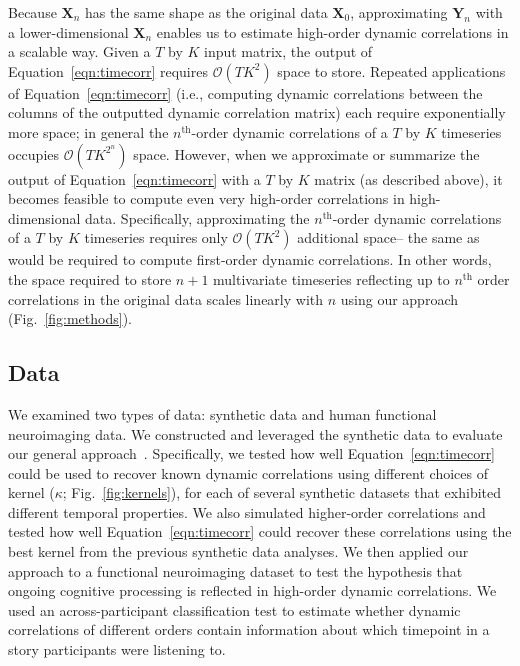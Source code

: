 \documentclass[english]{article}
\begin{document}
Because $\mathbf{X}_n$ has the same shape as the original data
$\mathbf{X}_0$, approximating $\mathbf{Y}_n$ with a lower-dimensional
$\mathbf{X}_n$ enables us to estimate high-order dynamic correlations
in a scalable way.  Given a $T$ by $K$ input matrix, the output of
Equation~\ref{eqn:timecorr} requires $\mathcal{O}(TK^2)$ space to
store.  Repeated applications of Equation~\ref{eqn:timecorr} (i.e.,
computing dynamic correlations between the columns of the outputted
dynamic correlation matrix) each require exponentially more space; in
general the $n^\mathrm{th}$-order dynamic correlations of a $T$ by $K$
timeseries occupies $\mathcal{O}(TK^{2^n})$ space.  However, when we
approximate or summarize the output of Equation~\ref{eqn:timecorr} with a $T$ by
$K$ matrix (as described above), it becomes feasible to compute even
very high-order correlations in high-dimensional data.  Specifically,
approximating the $n^\mathrm{th}$-order dynamic correlations of a $T$
by $K$ timeseries requires only $\mathcal{O}(TK^2)$ additional space--
the same as would be required to compute first-order dynamic
correlations. In other words, the space required to store $n+1$
multivariate timeseries reflecting up to $n^\mathrm{th}$ order
correlations in the original data scales linearly with $n$ using our
approach (Fig.~\ref{fig:methods}).

\subsection*{Data}
We examined two types of data: synthetic data and human functional
neuroimaging data.  We constructed and leveraged the synthetic data to
evaluate our general approach~\citep[for a related validation approach
see][]{ThomEtal18}.  Specifically, we tested how well
Equation~\ref{eqn:timecorr} could be used to recover known dynamic
correlations using different choices of kernel ($\kappa$;
Fig.~\ref{fig:kernels}), for each of several synthetic datasets that
exhibited different temporal properties. We also simulated
higher-order correlations and tested how well
Equation~\ref{eqn:timecorr} could recover these correlations using the
best kernel from the previous synthetic data analyses.  We then applied our
approach to a functional neuroimaging dataset to test the hypothesis
that ongoing cognitive processing is reflected in high-order dynamic
correlations.  We used an across-participant classification test to
estimate whether dynamic correlations of different orders contain
information about which timepoint in a story participants were
listening to.
\end{document}

